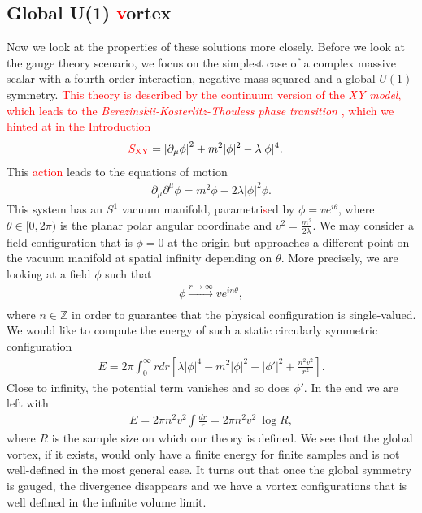         \subsection{Global U(1) \textcolor{red}{v}ortex}

        Now we look at the properties of these solutions more closely. Before we look at the gauge theory scenario, we focus on the simplest case of a complex massive scalar with a fourth order interaction, negative mass squared and a global $U(1)$ symmetry. \textcolor{red}{This theory is described by the continuum version of the \textit{XY model}, which leads to the \textit{Berezinskii-Kosterlitz-Thouless phase transition} \cite{Kosterlitz_1973, Berezinsky:1970fr, Berezinsky:1972rfj}, which we hinted at in the Introduction}
        \begin{align}
            \textcolor{red}{S_{\text{XY}}} &=  \left|\partial_{\mu} \phi \right|^2 + m^2 | \phi |^2 - \lambda |\phi|^4.
        \end{align}
    This \textcolor{red}{action} leads to the equations of motion
    \begin{align}
        \partial_{\mu} \partial^{\mu} \phi = m^2 \phi - 2\lambda |\phi|^2 \phi.
    \end{align}
    This system has an $S^1$ vacuum manifold, parametri\textcolor{red}{s}ed by $\phi = v e^{i \theta}$, where $\theta \in [0,2\pi)$ is the planar polar angular coordinate and $v^2 = \frac{m^2}{2 \lambda}$. We may consider a field configuration that is $\phi=0$ at the origin but approaches a different point on the vacuum manifold at spatial infinity depending on $\theta$. More precisely, we are looking at a field $\phi$ such that
    \begin{align}
        \phi \xrightarrow[]{r\rightarrow \infty} v e^{i n\theta},
    \end{align}
    where $n \in \mathbb{Z}$ in order to guarantee that the physical configuration is single-valued.
    We would like to compute the energy of such a static circularly symmetric configuration
    \begin{align}
        E= 2 \pi \int_0^{\infty} r dr \left[\lambda |\phi|^4 - m^2 |\phi|^2 + |\phi'|^2 + \frac{n^2 v^2}{r^2} \right].
    \end{align}
    Close to infinity, the potential term vanishes and so does $\phi'$. In the end we are left with
    \begin{align}
        E = 2\pi n^2 v^2 \int \frac{dr}{r} =  2\pi n^2 v^2  \ \log R,
    \end{align}
    where $R$ is the sample size on which our theory is defined. We see that the global vortex, if it exists, would only have a finite energy for finite samples and is not well-defined in the most general case. It turns out that once the global symmetry is gauged, the divergence disappears and we have a vortex configurations that is well defined in the infinite volume limit.
